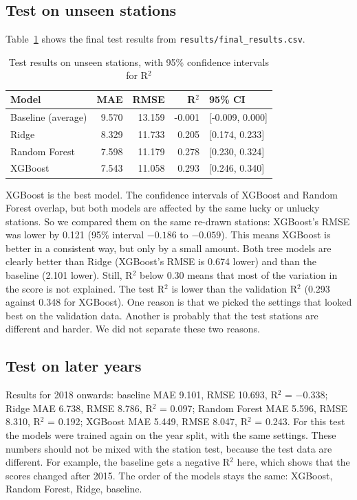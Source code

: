 \documentclass[11pt,a4paper]{article}
\begin{document}
\subsection{Test on unseen stations}
Table~\ref{tab:test} shows the final test results from \texttt{results/final\_results.csv}.
\begin{table}[H]\caption{Test results on unseen stations, with 95\% confidence intervals for R$^2$}\label{tab:test}\centering\footnotesize
\begin{tabular}{@{}lrrrl@{}}\toprule Model & MAE & RMSE & R$^2$ & 95\% CI\\\midrule
Baseline (average) & 9.570 & 13.159 & -0.001 & [-0.009, 0.000]\\
Ridge & 8.329 & 11.733 & 0.205 & [0.174, 0.233]\\
Random Forest & 7.598 & 11.179 & 0.278 & [0.230, 0.324]\\
XGBoost & 7.543 & 11.058 & 0.293 & [0.246, 0.340]\\\bottomrule\end{tabular}\end{table}
XGBoost is the best model. The confidence intervals of XGBoost and Random Forest overlap, but both models are affected by the same lucky or unlucky stations. So we compared them on the same re-drawn stations: XGBoost's RMSE was lower by 0.121 (95\% interval $-0.186$ to $-0.059$). This means XGBoost is better in a consistent way, but only by a small amount. Both tree models are clearly better than Ridge (XGBoost's RMSE is 0.674 lower) and than the baseline (2.101 lower). Still, R$^2$ below 0.30 means that most of the variation in the score is not explained. The test R$^2$ is lower than the validation R$^2$ (0.293 against 0.348 for XGBoost). One reason is that we picked the settings that looked best on the validation data. Another is probably that the test stations are different and harder. We did not separate these two reasons.

\subsection{Test on later years}
Results for 2018 onwards: baseline MAE 9.101, RMSE 10.693, R$^2$ = $-0.338$; Ridge MAE 6.738, RMSE 8.786, R$^2$ = 0.097; Random Forest MAE 5.596, RMSE 8.310, R$^2$ = 0.192; XGBoost MAE 5.449, RMSE 8.047, R$^2$ = 0.243. For this test the models were trained again on the year split, with the same settings. These numbers should not be mixed with the station test, because the test data are different. For example, the baseline gets a negative R$^2$ here, which shows that the scores changed after 2015. The order of the models stays the same: XGBoost, Random Forest, Ridge, baseline.
\end{document}
